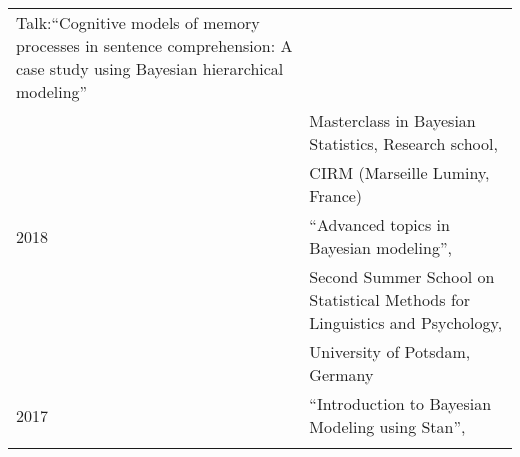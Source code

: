 \documentclass[]{article}
\begin{document}
\begin{longtable}[]{@{}ll@{}}
\begin{minipage}[t]{0.69\columnwidth}
Talk:``Cognitive models of memory processes in sentence comprehension: A
case study using Bayesian hierarchical modeling''\strut
\end{minipage}\tabularnewline
\begin{minipage}[t]{0.25\columnwidth}\raggedright
\strut
\end{minipage} & \begin{minipage}[t]{0.69\columnwidth}\raggedright
Masterclass in Bayesian Statistics, Research school,\strut
\end{minipage}\tabularnewline
\begin{minipage}[t]{0.25\columnwidth}\raggedright
\strut
\end{minipage} & \begin{minipage}[t]{0.69\columnwidth}\raggedright
CIRM (Marseille Luminy, France)\vspace{.1cm}\strut
\end{minipage}\tabularnewline
\begin{minipage}[t]{0.25\columnwidth}\raggedright
2018\strut
\end{minipage} & \begin{minipage}[t]{0.69\columnwidth}\raggedright
``Advanced topics in Bayesian modeling'',\strut
\end{minipage}\tabularnewline
\begin{minipage}[t]{0.25\columnwidth}\raggedright
\strut
\end{minipage} & \begin{minipage}[t]{0.69\columnwidth}\raggedright
Second Summer School on Statistical Methods for Linguistics and
Psychology,\strut
\end{minipage}\tabularnewline
\begin{minipage}[t]{0.25\columnwidth}\raggedright
\strut
\end{minipage} & \begin{minipage}[t]{0.69\columnwidth}\raggedright
University of Potsdam, Germany\vspace{.1cm}\strut
\end{minipage}\tabularnewline
\begin{minipage}[t]{0.25\columnwidth}\raggedright
2017\strut
\end{minipage} & \begin{minipage}[t]{0.69\columnwidth}\raggedright
``Introduction to Bayesian Modeling using Stan'',\strut
\end{minipage}\tabularnewline
\begin{minipage}[t]{0.25\columnwidth}\raggedright

\end{minipage}
\end{longtable}
\end{document}
